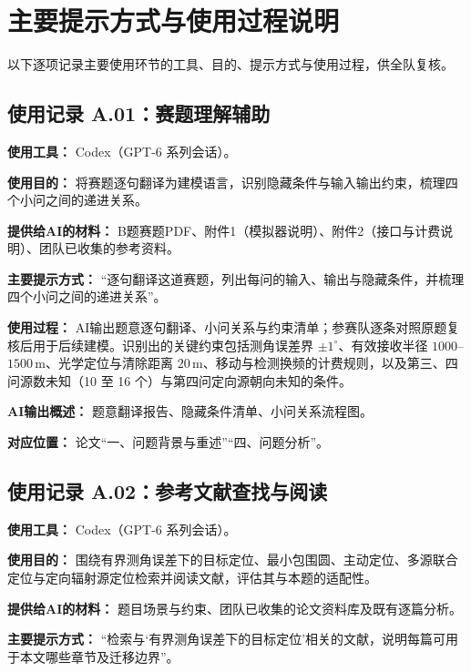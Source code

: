 \documentclass[UTF8,a4paper,zihao=-4]{ctexart}
\begin{document}
\section*{主要提示方式与使用过程说明}

以下逐项记录主要使用环节的工具、目的、提示方式与使用过程，供全队复核。

\subsection*{使用记录 A.01：赛题理解辅助}

\noindent\textbf{使用工具：} Codex（GPT-6 系列会话）。

\noindent\textbf{使用目的：} 将赛题逐句翻译为建模语言，识别隐藏条件与输入输出约束，梳理四个小问之间的递进关系。

\noindent\textbf{提供给AI的材料：} B题赛题PDF、附件1（模拟器说明）、附件2（接口与计费说明）、团队已收集的参考资料。

\noindent\textbf{主要提示方式：} “逐句翻译这道赛题，列出每问的输入、输出与隐藏条件，并梳理四个小问之间的递进关系”。

\noindent\textbf{使用过程：} AI输出题意逐句翻译、小问关系与约束清单；参赛队逐条对照原题复核后用于后续建模。识别出的关键约束包括测角误差界 \(\pm1^\circ\)、有效接收半径 \(1000\)--\(1500\,\mathrm{m}\)、光学定位与清除距离 \(20\,\mathrm{m}\)、移动与检测换频的计费规则，以及第三、四问源数未知（10 至 16 个）与第四问定向源朝向未知的条件。

\noindent\textbf{AI输出概述：} 题意翻译报告、隐藏条件清单、小问关系流程图。

\noindent\textbf{对应位置：} 论文“一、问题背景与重述”“四、问题分析”。

\subsection*{使用记录 A.02：参考文献查找与阅读}

\noindent\textbf{使用工具：} Codex（GPT-6 系列会话）。

\noindent\textbf{使用目的：} 围绕有界测角误差下的目标定位、最小包围圆、主动定位、多源联合定位与定向辐射源定位检索并阅读文献，评估其与本题的适配性。

\noindent\textbf{提供给AI的材料：} 题目场景与约束、团队已收集的论文资料库及既有逐篇分析。

\noindent\textbf{主要提示方式：} “检索与‘有界测角误差下的目标定位’相关的文献，说明每篇可用于本文哪些章节及迁移边界”。
\end{document}
